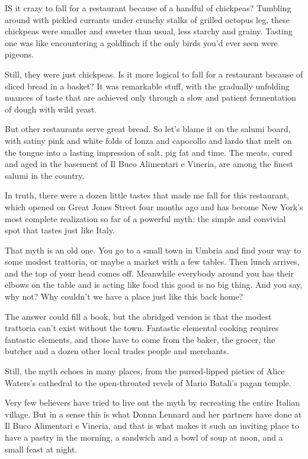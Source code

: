 IS it crazy to fall for a restaurant because of a handful of chickpeas?
Tumbling around with pickled currants under crunchy stalks of grilled
octopus leg, these chickpeas were smaller and sweeter than usual, less
starchy and grainy. Tasting one was like encountering a goldfinch if the
only birds you'd ever seen were pigeons.

Still, they were just chickpeas. Is it more logical to fall for a
restaurant because of sliced bread in a basket? It was remarkable stuff,
with the gradually unfolding nuances of taste that are achieved only
through a slow and patient fermentation of dough with wild yeast.

But other restaurants serve great bread. So let's blame it on the salumi
board, with satiny pink and white folds of lonza and capocollo and lardo
that melt on the tongue into a lasting impression of salt, pig fat and
time. The meats, cured and aged in the basement of Il Buco Alimentari e
Vineria, are among the finest salumi in the country.

In truth, there were a dozen little tastes that made me fall for this
restaurant, which opened on Great Jones Street four months ago and has
become New York's most complete realization so far of a powerful myth:
the simple and convivial spot that tastes just like Italy.

That myth is an old one. You go to a small town in Umbria and find your
way to some modest trattoria, or maybe a market with a few tables. Then
lunch arrives, and the top of your head comes off. Meanwhile everybody
around you has their elbows on the table and is acting like food this
good is no big thing. And you say, why not? Why couldn't we have a place
just like this back home?

The answer could fill a book, but the abridged version is that the
modest trattoria can't exist without the town. Fantastic elemental
cooking requires fantastic elements, and those have to come from the
baker, the grocer, the butcher and a dozen other local trades people and
merchants.

Still, the myth echoes in many places, from the pursed-lipped pieties of
Alice Waters's cathedral to the open-throated revels of Mario Batali's
pagan temple.

Very few believers have tried to live out the myth by recreating the
entire Italian village. But in a sense this is what Donna Lennard and
her partners have done at Il Buco Alimentari e Vineria, and that is what
makes it such an inviting place to have a pastry in the morning, a
sandwich and a bowl of soup at noon, and a small feast at night.

